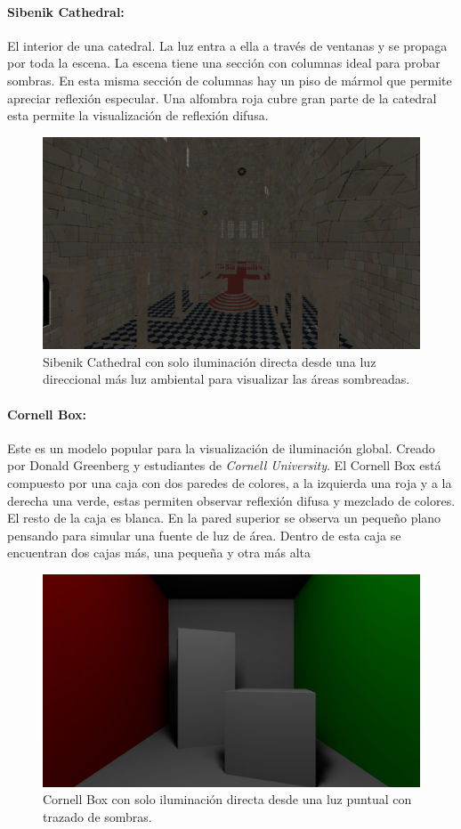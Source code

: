 \paragraph{Sibenik Cathedral:} El interior de una catedral. La luz entra a ella a través de ventanas y se propaga por toda la escena. La escena tiene una sección con columnas ideal para probar sombras. En esta misma sección de columnas hay un piso de mármol que permite apreciar reflexión especular. Una alfombra roja cubre gran parte de la catedral esta permite la visualización de reflexión difusa.

\begin{figure}[H]
	\centering
	\includegraphics[width=0.65\linewidth]{media/scenes/sibenik.png}
	\caption{Sibenik Cathedral con solo iluminación directa desde una luz direccional más luz ambiental para visualizar las áreas sombreadas.}
	\label{fig:sibenik}
\end{figure}

\paragraph{Cornell Box:} Este es un modelo popular para la visualización de iluminación global. Creado por Donald Greenberg y estudiantes de \emph{Cornell University}. El Cornell Box está compuesto por una caja con dos paredes de colores, a la izquierda una roja y a la derecha una verde, estas permiten observar reflexión difusa y mezclado de colores. El resto de la caja es blanca. En la pared superior se observa un pequeño plano pensando para simular una fuente de luz de área. Dentro de esta caja se encuentran dos cajas más, una pequeña y otra más alta

\begin{figure}[H]
	\centering
	\includegraphics[width=0.65\linewidth]{media/scenes/cornell.png}
	\caption{Cornell Box con solo iluminación directa desde una luz puntual con trazado de sombras.}
	\label{fig:cornell}
\end{figure}

